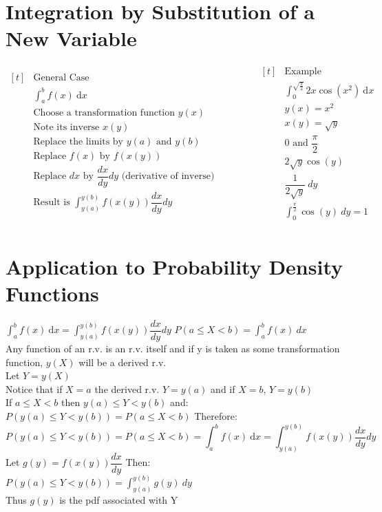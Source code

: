 \documentclass[openany]{book}
\newcommand{\dx}{\mathrm{d}x}
\begin{document}
\begin{flushleft}
\section{Integration by Substitution of a New Variable}
\begin{equation*}
\begin{aligned}[t]
&\text{General Case} \\
&\int_{a}^{b}f(x)\ \dx \\
&\text{Choose a transformation function } y(x)\\
&\text{Note its inverse } x(y)\\
&\text{Replace the limits by } y(a) \text{ and } y(b)\\
&\text{Replace } f(x) \text{ by } f(x(y))\\
&\text{Replace } dx \text{ by } \dfrac{dx}{dy}dy \text{ (derivative of inverse)}\\
&\text{Result is } \int_{y(a)}^{y(b)}f(x(y))\dfrac{dx}{dy}dy\\
\end{aligned}
\qquad \qquad
\begin{aligned}[t]
&\text{Example}\\
&\int_{0}^{\sqrt{\frac{\pi}{2}}}2x\cos(x^2)\ \dx\\
& y(x)=x^2\\
& x(y)=\sqrt{y}\\
& 0 \text{ and } \dfrac{\pi}{2}\\
& 2 \sqrt{y} \cos(y)\\
& \dfrac{1}{2\sqrt{y}} \ dy\\
&\int_{0}^{\frac{\pi}{2}} \cos(y) \ dy=1\\
\end{aligned}
\end{equation*}
\section{Application to Probability Density Functions}
$\int_{a}^{b}f(x) \ \dx=\int_{y(a)}^{y(b)}f(x(y))\dfrac{dx}{dy}dy$\medbreak
$P(a\leq X<b)=\int_{a}^{b}f(x)\ dx$\\
Any function of an r.v. is an r.v. itself and if y is taken as some transformation function, $y(X)$ will be a derived r.v.\\
Let $Y=y(X)$\\
Notice that if $X=a$ the derived r.v. $Y=y(a)$ and if $X=b$, $Y=y(b)$\\
If $a\leq X <b$ then $y(a)\leq Y<y(b)$ and:\\
$P(y(a)\leq Y<y(b))=P(a\leq X<b)$ Therefore:
\[P(y(a)\leq Y<y(b))=P(a\leq X<b)=\int_{a}^{b}f(x) \ \dx=\int_{y(a)}^{y(b)}f(x(y))\dfrac{dx}{dy}dy
\]
Let $g(y)=f(x(y))\dfrac{dx}{dy}$ Then:\\
$P(y(a)\leq Y<y(b))=\int_{y(a)}^{y(b)}g(y) \ dy$\\
Thus $g(y)$ is the pdf associated with Y

\end{flushleft}
\end{document}
